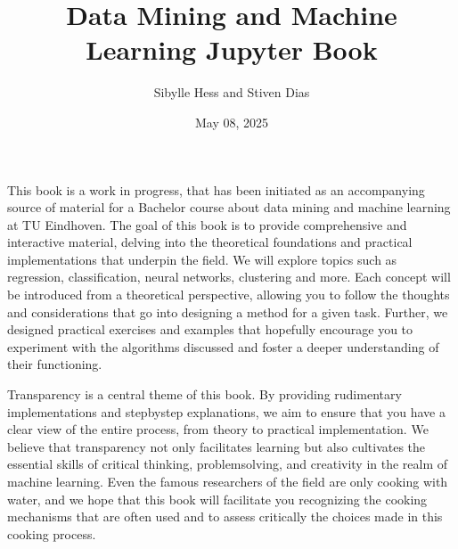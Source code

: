 \documentclass[letterpaper,10pt,english]{jupyterBook}
\title{Data Mining and Machine Learning Jupyter Book}
\date{May 08, 2025}
\author{Sibylle Hess and Stiven Dias}
\begin{document}
\pagestyle{empty}
\sphinxmaketitle
\pagestyle{plain}
\sphinxtableofcontents
\pagestyle{normal}
\label{\detokenize{intro::doc}}


\sphinxAtStartPar
This book is a work in progress, that has been initiated as an accompanying source of material for a Bachelor course about data mining and machine learning at TU Eindhoven. The goal of this book is to provide comprehensive and interactive material, delving into the theoretical foundations and practical implementations that underpin the field. We will explore topics such as regression, classification, neural networks, clustering and more. Each concept will be introduced from a theoretical perspective, allowing you to follow the thoughts and considerations that go into designing a method for a given task. Further, we designed practical exercises and examples that hopefully encourage you to experiment with the algorithms discussed and foster a deeper understanding of their functioning.

\sphinxAtStartPar
Transparency is a central theme of this book. By providing rudimentary implementations and step\sphinxhyphen{}by\sphinxhyphen{}step explanations, we aim to ensure that you have a clear view of the entire process, from theory to practical implementation. We believe that transparency not only facilitates learning but also cultivates the essential skills of critical thinking, problem\sphinxhyphen{}solving, and creativity in the realm of machine learning. Even the famous researchers of the field are only cooking with water, and we hope that this book will facilitate you recognizing the cooking mechanisms that are often used and to assess critically the choices made in this cooking process.
\end{document}
